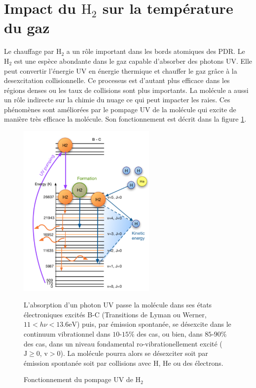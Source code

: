 \section{Impact du $\mathrm{H}_2$ sur la température du gaz}

Le chauffage par $\mathrm{H}_2$ a un rôle important dans les bords atomiques des PDR. Le $\mathrm{H}_2$ est une espèce abondante dans le gaz capable d'absorber des photons UV. Elle peut convertir l'énergie UV en énergie thermique et chauffer le gaz grâce à la desexcitation collisionnelle. Ce processus est d'autant plus efficace dans les régions denses ou les taux de collisions sont plus importants. La molécule a aussi un rôle indirecte sur la chimie du nuage ce qui peut impacter les raies. Ces phénomènes sont améliorées par le pompage UV de la molécule qui excite de manière très efficace la molécule. Son fonctionnement
 est décrit dans la figure \ref{fig:H2pump}. \newline 


\begin{figure}[!h]
    \centering \includegraphics[trim = {0 0 0 0},clip,width=0.6\textwidth]{figure/h2.pdf}
    \caption{Fonctionnement du pompage UV de $\mathrm{H}_2$}
    \begin{minipage}{\textwidth}
L'absorption d'un photon UV passe la molécule dans ses états électroniques excités B-C (Transitions de Lyman ou Werner, $ 11<h\nu<13.6\mathrm{eV}$) puis, par émission spontanée, se désexcite dans le continuum vibrationnel dans $10$-$15\%$ des cas, ou bien, dans $85$-$90\%$ des cas, dans un niveau fondamental ro-vibrationellement excité ($\mathrm{J}\geq0$, $\mathrm{v}>0$). La molécule pourra alors se désexciter soit par émission spontanée soit par collisions avec $\mathrm{H}$, $\mathrm{He}$ ou des électrons. 
    \end{minipage}
    \label{fig:H2pump}
\end{figure}



